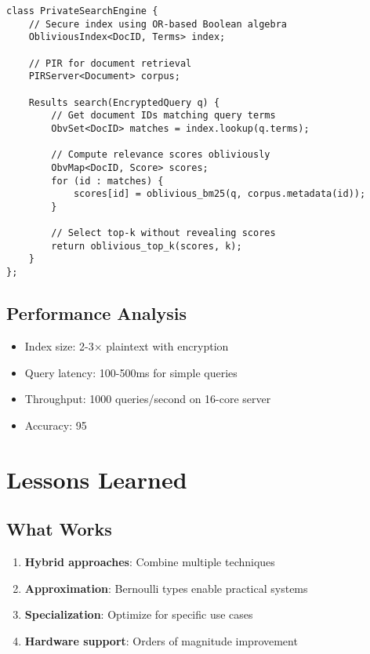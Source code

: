 \documentclass[11pt,final]{article}
\begin{document}
\begin{verbatim}
class PrivateSearchEngine {
    // Secure index using OR-based Boolean algebra
    ObliviousIndex<DocID, Terms> index;
    
    // PIR for document retrieval
    PIRServer<Document> corpus;
    
    Results search(EncryptedQuery q) {
        // Get document IDs matching query terms
        ObvSet<DocID> matches = index.lookup(q.terms);
        
        // Compute relevance scores obliviously
        ObvMap<DocID, Score> scores;
        for (id : matches) {
            scores[id] = oblivious_bm25(q, corpus.metadata(id));
        }
        
        // Select top-k without revealing scores
        return oblivious_top_k(scores, k);
    }
};
\end{verbatim}

\subsection{Performance Analysis}

\begin{itemize}
    \item Index size: 2-3× plaintext with encryption
    \item Query latency: 100-500ms for simple queries
    \item Throughput: 1000 queries/second on 16-core server
    \item Accuracy: 95%
\end{itemize}

\section{Lessons Learned}

\subsection{What Works}

\begin{enumerate}
    \item \textbf{Hybrid approaches}: Combine multiple techniques
    \item \textbf{Approximation}: Bernoulli types enable practical systems
    \item \textbf{Specialization}: Optimize for specific use cases
    \item \textbf{Hardware support}: Orders of magnitude improvement
\end{enumerate}
\end{document}
